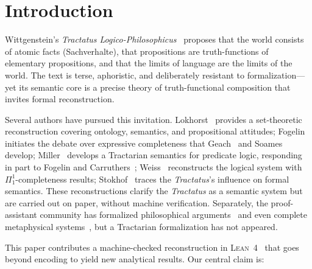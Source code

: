 \documentclass[jsl,bibother]{asl}
\theoremstyle{definition}
\theoremstyle{remark}
\newcommand{\Lean}{\textsc{Lean}}
\begin{document}
\maketitle

\section{Introduction}
\label{sec:intro}

Wittgenstein's \emph{Tractatus Logico-Philosophicus}~\cite{wittgenstein1921}
proposes that the world consists of atomic facts (Sachverhalte),
that propositions are truth-functions of elementary propositions,
and that the limits of language are the limits of the world.
The text is terse, aphoristic, and deliberately resistant to
formalization---yet its semantic core is a precise theory of
truth-functional composition that invites formal reconstruction.

Several authors have pursued this invitation.
Lokhorst~\cite{lokhorst1988} provides a set-theoretic
reconstruction covering ontology, semantics, and propositional
attitudes;
Fogelin~\cite{fogelin1987} initiates the debate over expressive
completeness that Geach~\cite{geach1981} and
Soames~\cite{soames1983} develop;
Miller~\cite{miller1995} develops a Tractarian semantics for
predicate logic, responding in part to Fogelin and
Carruthers~\cite{carruthers1989};
Weiss~\cite{weiss2017} reconstructs the logical system with
$\Pi^1_1$-completeness results;
Stokhof~\cite{stokhof2008} traces the \emph{Tractatus}'s
influence on formal semantics.
These reconstructions clarify the \emph{Tractatus} as a semantic
system but are carried out on paper, without machine verification.
Separately, the proof-assistant community has formalized
philosophical arguments~\cite{benzmuller2017,fitelson2007} and
even complete metaphysical systems~\cite{scherf2025}, but a
Tractarian formalization has not appeared.

This paper contributes a machine-checked reconstruction in
\Lean~4~\cite{moura2021} that goes beyond encoding to yield new
analytical results.  Our central claim is:
\end{document}
